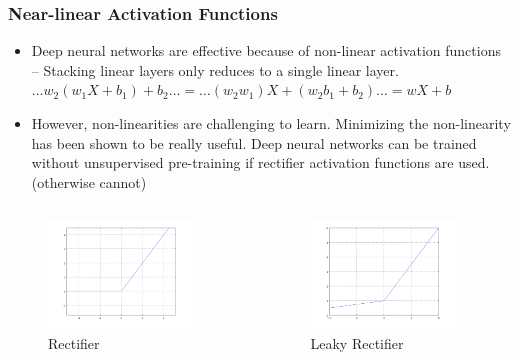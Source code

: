 \documentclass[8pt]{beamer}
\begin{document}
\begin{frame}
\frametitle{Near-linear Activation Functions}
 \begin{itemize}
  \item Deep neural networks are effective because of non-linear activation functions – Stacking linear
        layers only reduces to a single linear layer. $ \dots w_2(w_1 X + b_1) + b_2 \dots = \dots (w_2 w_1) X + (w_2 b_1 + b_2) \dots = wX + b $
  \item However, non-linearities are challenging to learn. Minimizing the non-linearity has been shown to
        be really useful. Deep neural networks can be trained without unsupervised pre-training if rectifier
        activation functions are used. (otherwise cannot)
 \end{itemize}
\begin{columns}
\begin{column}{0.5\textwidth}
 \begin{figure}[h]
   \caption{Rectifier}
   \includegraphics[width=0.9\textwidth]{./rect.png}
 \end{figure}
\end{column}
\begin{column}{0.5\textwidth}
 \begin{figure}[h]
   \caption{Leaky Rectifier}
   \includegraphics[width=0.9\textwidth]{./leaky_rect.png}
 \end{figure}
\end{column}
\end{columns}
\end{frame}
\end{document}
